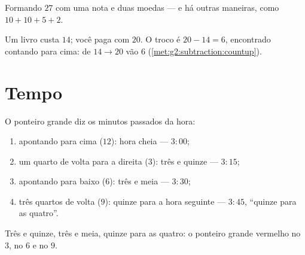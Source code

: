 \begin{omfigure}

{\small Formando $27$ com uma nota e duas moedas --- e há outras
maneiras, como $10 + 10 + 5 + 2$.}
\end{omfigure}

\begin{example}[Troco]\label{ex:g2:measure:change}
Um livro custa $14$; você paga com $20$. O troco é $20 - 14 = 6$,
encontrado contando para cima: de $14 \to 20$ vão $6$
(\cref{met:g2:subtraction:countup}).
\end{example}

\section{Tempo}

\begin{method}\label{met:g2:measure:clock}
O ponteiro grande diz os minutos passados da hora:
\begin{enumerate}
  \item apontando para cima ($12$): hora cheia --- $3{:}00$;
  \item um quarto de volta para a direita ($3$): três e quinze ---
        $3{:}15$;
  \item apontando para baixo ($6$): três e meia --- $3{:}30$;
  \item três quartos de volta ($9$): quinze para a hora seguinte ---
        $3{:}45$, ``quinze para as quatro''.
\end{enumerate}
\end{method}

\begin{omfigure}

{\small Três e quinze, três e meia, quinze para as quatro: o ponteiro
grande vermelho no $3$, no $6$ e no $9$.}
\end{omfigure}

